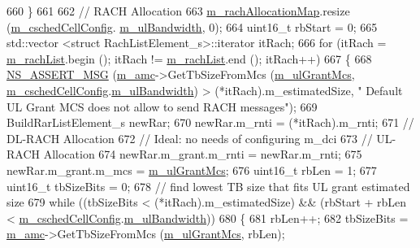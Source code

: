 \begin{DoxyCode}
660     \}
661 
662   \textcolor{comment}{// RACH Allocation}
663   \hyperlink{classns3_1_1FdMtFfMacScheduler_aab050196c56e8564eb4d0c8aedd900d3}{m\_rachAllocationMap}.resize (\hyperlink{classns3_1_1FdMtFfMacScheduler_a9f2e3c6bfae8bfc266a84f64e5937ac8}{m\_cschedCellConfig}.
      \hyperlink{structns3_1_1FfMacCschedSapProvider_1_1CschedCellConfigReqParameters_a5ab5b102878e6e7e7727a14af4a64d2f}{m\_ulBandwidth}, 0);
664   uint16\_t rbStart = 0;
665   std::vector <struct RachListElement\_s>::iterator itRach;
666   \textcolor{keywordflow}{for} (itRach = \hyperlink{classns3_1_1FdMtFfMacScheduler_a1d2f0501b8ad79cdbda0437a0efb417e}{m\_rachList}.begin (); itRach != \hyperlink{classns3_1_1FdMtFfMacScheduler_a1d2f0501b8ad79cdbda0437a0efb417e}{m\_rachList}.end (); itRach++)
667     \{
668       \hyperlink{assert_8h_aff5ece9066c74e681e74999856f08539}{NS\_ASSERT\_MSG} (\hyperlink{classns3_1_1FdMtFfMacScheduler_a243eae6fea006597039d90bc727786eb}{m\_amc}->GetTbSizeFromMcs (\hyperlink{classns3_1_1FdMtFfMacScheduler_ab8c9552a2f6d8786259bfda40562f792}{m\_ulGrantMcs}, 
      \hyperlink{classns3_1_1FdMtFfMacScheduler_a9f2e3c6bfae8bfc266a84f64e5937ac8}{m\_cschedCellConfig}.\hyperlink{structns3_1_1FfMacCschedSapProvider_1_1CschedCellConfigReqParameters_a5ab5b102878e6e7e7727a14af4a64d2f}{m\_ulBandwidth}) > (*itRach).m\_estimatedSize, \textcolor{stringliteral}{" Default UL
       Grant MCS does not allow to send RACH messages"});
669       BuildRarListElement\_s newRar;
670       newRar.m\_rnti = (*itRach).m\_rnti;
671       \textcolor{comment}{// DL-RACH Allocation}
672       \textcolor{comment}{// Ideal: no needs of configuring m\_dci}
673       \textcolor{comment}{// UL-RACH Allocation}
674       newRar.m\_grant.m\_rnti = newRar.m\_rnti;
675       newRar.m\_grant.m\_mcs = \hyperlink{classns3_1_1FdMtFfMacScheduler_ab8c9552a2f6d8786259bfda40562f792}{m\_ulGrantMcs};
676       uint16\_t rbLen = 1;
677       uint16\_t tbSizeBits = 0;
678       \textcolor{comment}{// find lowest TB size that fits UL grant estimated size}
679       \textcolor{keywordflow}{while} ((tbSizeBits < (*itRach).m\_estimatedSize) && (rbStart + rbLen < 
      \hyperlink{classns3_1_1FdMtFfMacScheduler_a9f2e3c6bfae8bfc266a84f64e5937ac8}{m\_cschedCellConfig}.\hyperlink{structns3_1_1FfMacCschedSapProvider_1_1CschedCellConfigReqParameters_a5ab5b102878e6e7e7727a14af4a64d2f}{m\_ulBandwidth}))
680         \{
681           rbLen++;
682           tbSizeBits = \hyperlink{classns3_1_1FdMtFfMacScheduler_a243eae6fea006597039d90bc727786eb}{m\_amc}->GetTbSizeFromMcs (\hyperlink{classns3_1_1FdMtFfMacScheduler_ab8c9552a2f6d8786259bfda40562f792}{m\_ulGrantMcs}, rbLen);

\end{DoxyCode}
